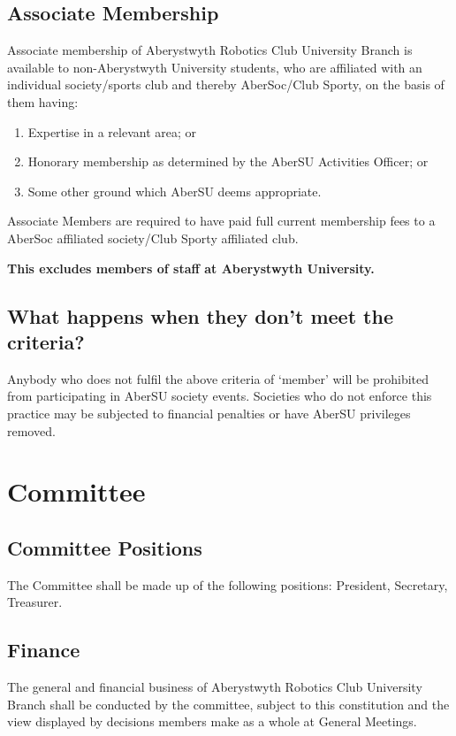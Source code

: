 \documentclass[a4paper,11pt]{article}
\begin{document}
\subsection{Associate Membership}
Associate membership of Aberystwyth Robotics Club University Branch is available to non-Aberystwyth University students, who are affiliated with an individual society/sports club and thereby AberSoc/Club Sporty, on the basis of them having:
\begin{enumerate}[nolistsep]
  \item Expertise in a relevant area; or
  \item Honorary membership as determined by the AberSU Activities Officer; or
  \item Some other ground which AberSU deems appropriate.
\end{enumerate}
Associate Members are required to have paid full current membership fees to a AberSoc affiliated society/Club Sporty affiliated club.
\begin{center}
\textbf{This excludes members of staff at Aberystwyth University.}
\end{center}

\subsection{What happens when they don't meet the criteria?}
Anybody who does not fulfil the above criteria of `member' will be prohibited from participating in AberSU society events. Societies who do not enforce this practice may be subjected to financial penalties or have AberSU privileges removed.

\section{Committee}
\subsection{Committee Positions}
The Committee shall be made up of the following positions: President, Secretary, Treasurer.

\subsection{Finance}
The general and financial business of Aberystwyth Robotics Club University Branch shall be conducted by the committee, subject to this constitution and the view displayed by decisions members make as a whole at General Meetings.
\end{document}
